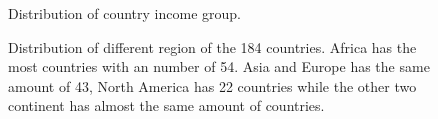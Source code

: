 \documentclass[
  letterpaper,
  DIV=11,
  numbers=noendperiod]{scrartcl}
\begin{document}
\begin{figure}


\caption{\label{fig-income}Distribution of country income group.}

\end{figure}%

\begin{figure}


\caption{\label{fig-region}Distribution of different region of the 184
countries. Africa has the most countries with an number of 54. Asia and
Europe has the same amount of 43, North America has 22 countries while
the other two continent has almost the same amount of countries.}

\end{figure}%
\end{document}
